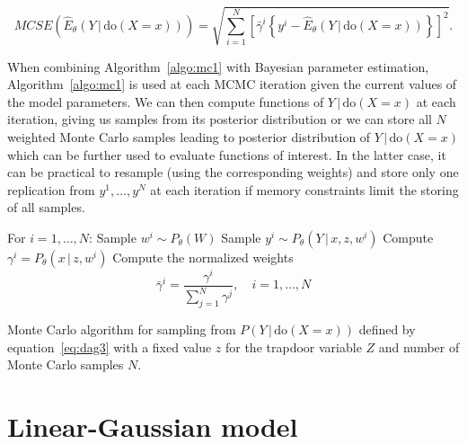 \documentclass{statsoc}
\newcommand{\+}[1]{\ensuremath{\mathbf{#1}}}
\newcommand{\doo}{\textrm{do}}
\newcommand{\given}{{ \, | \, }}
\begin{document}
\begin{equation*}
MCSE\left(\widehat E_\theta(Y \given \doo(X = x))\right) = \sqrt{\sum_{i=1}^N\left[\bar \gamma^i \left\{y^i - \widehat E_\theta(Y \given \doo(X = x))\right\}\right]^2}.
\end{equation*} 

When combining Algorithm~\ref{algo:mc1} with Bayesian parameter estimation, Algorithm~\ref{algo:mc1} is used at each MCMC iteration given the current values of the model parameters. We can then compute functions of $Y \given  \doo(X = x)$ at each iteration, giving us samples from its posterior distribution or we can store all $N$ weighted Monte Carlo samples leading to posterior distribution of $Y \given \doo(X = x)$ which can be further used to evaluate functions of interest. In the latter case, it can be practical to resample (using the corresponding weights) and store only one replication from ${y^1,\ldots, y^N}$ at each iteration if memory constraints limit the storing of all samples.

\begin{algorithm}[!t]
	\begin{algorithmic}[1]
		\State For $i = 1,\ldots,N$:
		\State \quad Sample $w^i \sim P_\theta(W)$
		\State \quad Sample $y^{i} \sim P_\theta(Y \given  x, z, w^i)$
		\State \quad Compute $\gamma^i = P_\theta(x \given  z, w^i)$
		\State Compute the normalized weights
		\[
		\bar \gamma^i = \frac{\gamma^i}{\sum_{j=1}^N \gamma^j}, \quad i = 1,\ldots,N
		\] 
	\end{algorithmic}
	\caption{Monte Carlo algorithm for sampling from $P(Y \given \doo(X = x))$ defined by equation~\eqref{eq:dag3} with a fixed value $z$ for the trapdoor variable $Z$ and number of Monte Carlo samples $N$.}
	\label{algo:mc1}
\end{algorithm}



\section{Linear-Gaussian model}
\label{sec:linear-gaussian-model}
\end{document}
